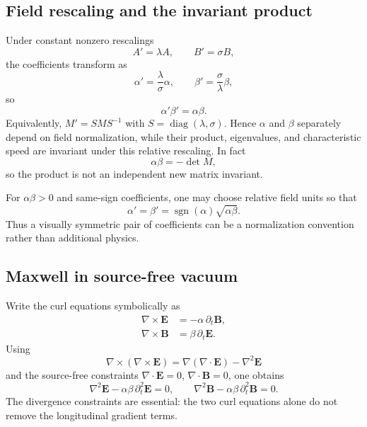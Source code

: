 \documentclass[11pt,a4paper]{article}
\begin{document}
\subsection{Field rescaling and the invariant product}
Under constant nonzero rescalings
\begin{equation}
A'=\lambda A,
\qquad
B'=\sigma B,
\end{equation}
the coefficients transform as
\begin{equation}
\alpha'=\frac\lambda\sigma\alpha,
\qquad
\beta'=\frac\sigma\lambda\beta,
\end{equation}
so
\begin{equation}
\boxed{\alpha'\beta'=\alpha\beta}.
\end{equation}
Equivalently, $M'=SMS^{-1}$ with $S=\operatorname{diag}(\lambda,\sigma)$. Hence $\alpha$ and $\beta$ separately depend on field normalization, while their product, eigenvalues, and characteristic speed are invariant under this relative rescaling. In fact
\begin{equation}
\alpha\beta=-\det M,
\end{equation}
so the product is not an independent new matrix invariant.

For $\alpha\beta>0$ and same-sign coefficients, one may choose relative field units so that
\begin{equation}
\alpha'=\beta'=\operatorname{sgn}(\alpha)\sqrt{\alpha\beta}.
\end{equation}
Thus a visually symmetric pair of coefficients can be a normalization convention rather than additional physics.

\subsection{Maxwell in source-free vacuum}
Write the curl equations symbolically as
\begin{align}
\nabla\times\mathbf E&=-\alpha\,\partial_t\mathbf B,\\
\nabla\times\mathbf B&=\beta\,\partial_t\mathbf E.
\end{align}
Using
\begin{equation}
\nabla\times(\nabla\times\mathbf E)
=\nabla(\nabla\cdot\mathbf E)-\nabla^2\mathbf E
\end{equation}
and the source-free constraints $\nabla\cdot\mathbf E=0$, $\nabla\cdot\mathbf B=0$, one obtains
\begin{equation}
\boxed{\nabla^2\mathbf E-\alpha\beta\,\partial_t^2\mathbf E=0},
\qquad
\boxed{\nabla^2\mathbf B-\alpha\beta\,\partial_t^2\mathbf B=0}.
\end{equation}
The divergence constraints are essential: the two curl equations alone do not remove the longitudinal gradient terms.
\end{document}
